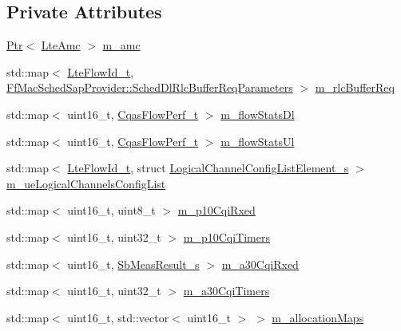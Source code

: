 \subsection*{Private Attributes}
\begin{DoxyCompactItemize}
\item 
\hyperlink{classns3_1_1Ptr}{Ptr}$<$ \hyperlink{classns3_1_1LteAmc}{Lte\+Amc} $>$ \hyperlink{classns3_1_1CqaFfMacScheduler_aa32ec6c7683816a4afdb922f73c0fdc6}{m\+\_\+amc}
\item 
std\+::map$<$ \hyperlink{structns3_1_1LteFlowId__t}{Lte\+Flow\+Id\+\_\+t}, \hyperlink{structns3_1_1FfMacSchedSapProvider_1_1SchedDlRlcBufferReqParameters}{Ff\+Mac\+Sched\+Sap\+Provider\+::\+Sched\+Dl\+Rlc\+Buffer\+Req\+Parameters} $>$ \hyperlink{classns3_1_1CqaFfMacScheduler_ae9f6c7fc32e6dd08573470c70d827610}{m\+\_\+rlc\+Buffer\+Req}
\item 
std\+::map$<$ uint16\+\_\+t, \hyperlink{structns3_1_1CqasFlowPerf__t}{Cqas\+Flow\+Perf\+\_\+t} $>$ \hyperlink{classns3_1_1CqaFfMacScheduler_a1cf6c47e55cbcfb9c28b17c242bde972}{m\+\_\+flow\+Stats\+Dl}
\item 
std\+::map$<$ uint16\+\_\+t, \hyperlink{structns3_1_1CqasFlowPerf__t}{Cqas\+Flow\+Perf\+\_\+t} $>$ \hyperlink{classns3_1_1CqaFfMacScheduler_ab5815a4876dc296d83b3d2d633418312}{m\+\_\+flow\+Stats\+Ul}
\item 
std\+::map$<$ \hyperlink{structns3_1_1LteFlowId__t}{Lte\+Flow\+Id\+\_\+t}, struct \hyperlink{structns3_1_1LogicalChannelConfigListElement__s}{Logical\+Channel\+Config\+List\+Element\+\_\+s} $>$ \hyperlink{classns3_1_1CqaFfMacScheduler_a2e7fafcc959bf531979bc041782ac5b1}{m\+\_\+ue\+Logical\+Channels\+Config\+List}
\item 
std\+::map$<$ uint16\+\_\+t, uint8\+\_\+t $>$ \hyperlink{classns3_1_1CqaFfMacScheduler_a05d86455f13e9c54ef7b7be87d74bf62}{m\+\_\+p10\+Cqi\+Rxed}
\item 
std\+::map$<$ uint16\+\_\+t, uint32\+\_\+t $>$ \hyperlink{classns3_1_1CqaFfMacScheduler_a3ca7ca5692a1cc661ac68052dc595948}{m\+\_\+p10\+Cqi\+Timers}
\item 
std\+::map$<$ uint16\+\_\+t, \hyperlink{structns3_1_1SbMeasResult__s}{Sb\+Meas\+Result\+\_\+s} $>$ \hyperlink{classns3_1_1CqaFfMacScheduler_a6894c40af99f8d6c6fdb201e7363fde9}{m\+\_\+a30\+Cqi\+Rxed}
\item 
std\+::map$<$ uint16\+\_\+t, uint32\+\_\+t $>$ \hyperlink{classns3_1_1CqaFfMacScheduler_ab6b356ca3bc799a5a1a51b7c687d87e4}{m\+\_\+a30\+Cqi\+Timers}
\item 
std\+::map$<$ uint16\+\_\+t, std\+::vector$<$ uint16\+\_\+t $>$ $>$ \hyperlink{classns3_1_1CqaFfMacScheduler_a3b02c0d7a89f3ed393066ba9bfda6210}{m\+\_\+allocation\+Maps}

\end{DoxyCompactItemize}
